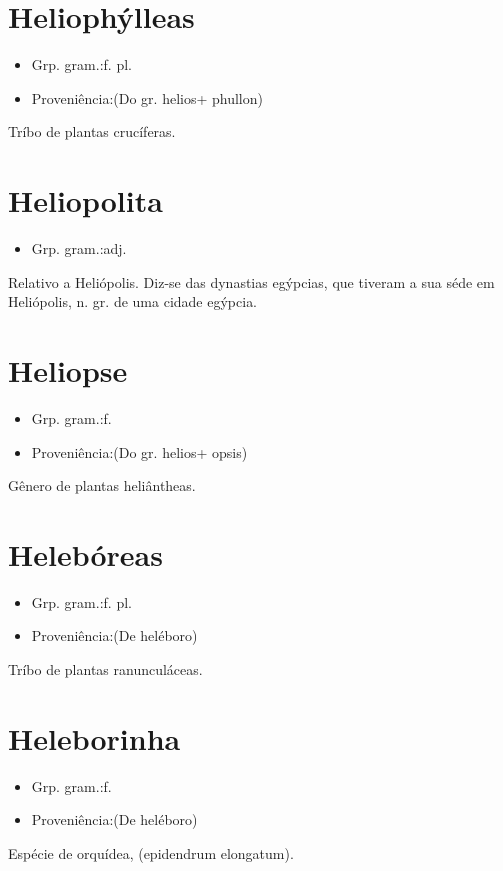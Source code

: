 \documentclass{article}
\begin{document}
\section{Heliophýlleas}
\begin{itemize}
\item {Grp. gram.:f. pl.}
\end{itemize}
\begin{itemize}
\item {Proveniência:(Do gr. \textunderscore helios\textunderscore  + \textunderscore phullon\textunderscore )}
\end{itemize}
Tríbo de plantas crucíferas.
\section{Heliopolita}
\begin{itemize}
\item {Grp. gram.:adj.}
\end{itemize}
Relativo a Heliópolis.
Diz-se das dynastias egýpcias, que tiveram a sua séde em Heliópolis, n. gr. de uma cidade egýpcia.
\section{Heliopse}
\begin{itemize}
\item {Grp. gram.:f.}
\end{itemize}
\begin{itemize}
\item {Proveniência:(Do gr. \textunderscore helios\textunderscore  + \textunderscore opsis\textunderscore )}
\end{itemize}
Gênero de plantas heliântheas.
\section{Helebóreas}
\begin{itemize}
\item {Grp. gram.:f. pl.}
\end{itemize}
\begin{itemize}
\item {Proveniência:(De \textunderscore heléboro\textunderscore )}
\end{itemize}
Tríbo de plantas ranunculáceas.
\section{Heleborinha}
\begin{itemize}
\item {Grp. gram.:f.}
\end{itemize}
\begin{itemize}
\item {Proveniência:(De \textunderscore heléboro\textunderscore )}
\end{itemize}
Espécie de orquídea, (\textunderscore epidendrum elongatum\textunderscore ).
\end{document}
